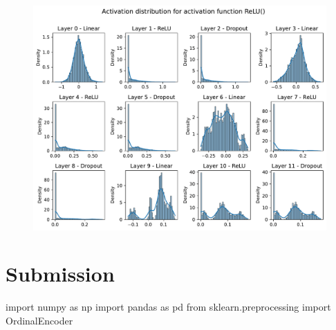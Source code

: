 \documentclass[
  letterpaper,
  DIV=11,
  numbers=noendperiod]{scrreprt}
\newenvironment{Shaded}{\begin{snugshade}}{\end{snugshade}}
\newcommand{\ImportTok}[1]{\textcolor[rgb]{0.00,0.46,0.62}{#1}}
\newcommand{\NormalTok}[1]{\textcolor[rgb]{0.00,0.23,0.31}{#1}}
\begin{document}
\begin{figure}[H]

{\centering \includegraphics{31_spot_lightning_csv_files/figure-pdf/cell-25-output-1.pdf}

}

\end{figure}

\hypertarget{submission}{%
\section{Submission}\label{submission}}

\begin{Shaded}
\begin{Highlighting}[]
\ImportTok{import}\NormalTok{ numpy }\ImportTok{as}\NormalTok{ np}
\ImportTok{import}\NormalTok{ pandas }\ImportTok{as}\NormalTok{ pd}
\ImportTok{from}\NormalTok{ sklearn.preprocessing }\ImportTok{import}\NormalTok{ OrdinalEncoder}
\end{Highlighting}
\end{Shaded}
\end{document}
